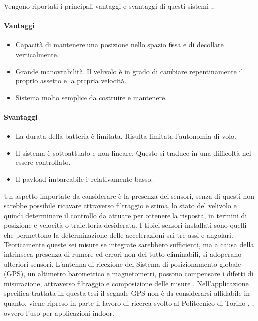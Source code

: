 Vengono riportati i principali vantaggi e svantaggi di questi sistemi \cite{DesTestCarm},\cite{irisquad}.
\paragraph{Vantaggi}
\begin{itemize}
	\item Capacità di mantenere una posizione nello spazio fissa e di decollare verticalmente.
	\item Grande manovrabilità. Il velivolo è in grado di cambiare repentinamente il proprio assetto e la propria velocità.
	\item Sistema molto semplice da costruire e mantenere.
\end{itemize}
\paragraph{Svantaggi}
\begin{itemize}
	\item La durata della batteria è limitata. Risulta limitata l'autonomia di volo.
	\item Il sistema è sottoattuato e non lineare. Questo si traduce in una difficoltà nel essere controllato.
	\item Il payload imbarcabile è relativamente basso.
\end{itemize}

Un aspetto importate da considerare è la presenza dei sensori, senza di questi non sarebbe possibile ricavare attraverso filtraggio e stima, lo stato del velivolo e quindi determinare il controllo da attuare per ottenere la risposta, in termini di posizione e velocità o traiettoria desiderata. I tipici sensori installati sono quelli che permettono la determinazione delle accelerazioni sui tre assi e angolari. Teoricamente queste sei misure se integrate sarebbero sufficienti, ma a causa della intrinseca presenza di rumore ed errori non del tutto eliminabili, si adoperano ulteriori sensori. L'antenna di ricezione del Sistema di posizionamento globale (GPS), un altimetro barometrico e magnetometri, possono compensare i difetti di misurazione, attraverso filtraggio e composizione delle misure \cite{KoksalN2018ALQA}. Nell'applicazione specifica trattata in questa tesi il segnale GPS non è da considerarsi affidabile in quanto, viene ripreso in parte il lavoro di ricerca svolto al Politecnico di Torino \cite{DesTestCarm}, \cite{baseTesi}, ovvero l'uso per applicazioni indoor.


